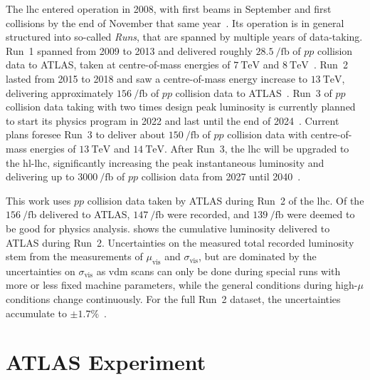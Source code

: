 The \gls{lhc} entered operation in 2008, with first beams in September and first collisions by the end of November that same year~\cite{startup}. Its operation is in general structured into so-called \textit{Runs}, that are spanned by multiple years of data-taking. Run~1 spanned from 2009 to 2013 and delivered roughly $\SI{28.5}{\per\femto\barn}$ of $pp$ collision data to ATLAS, taken at centre-of-mass energies of $\SI{7}{\TeV}$ and $\SI{8}{\TeV}$~\cite{Aad:2011dr,Aad:1517411,Aaboud:2016hhf}. Run~2 lasted from 2015 to 2018 and saw a centre-of-mass energy increase to $\SI{13}{\TeV}$, delivering approximately $\SI{156}{\per\femto\barn}$ of $pp$ collision data to ATLAS~\cite{ATLAS-CONF-2019-021}. Run~3 of $pp$ collision data taking with two times design peak luminosity is currently planned to start its physics program in 2022 and last until the end of 2024~\cite{run3}. Current plans foresee Run~3 to deliver about $\SI{150}{\per\femto\barn}$ of $pp$ collision data with centre-of-mass energies of $\SI{13}{\TeV}$ and $\SI{14}{\TeV}$. After Run~3, the \gls{lhc} will be upgraded to the \gls{hl-lhc}, significantly increasing the peak instantaneous luminosity and delivering up to $\SI{3000}{\per\femto\barn}$ of $pp$ collision data from 2027 until 2040~\cite{run3,Apollinari:2284929}. 

This work uses $pp$ collision data taken by ATLAS during Run~2 of the \gls{lhc}. Of the $\SI{156}{\per\femto\barn}$ delivered to ATLAS, $\SI{147}{\per\femto\barn}$ were recorded, and $\SI{139}{\per\femto\barn}$ were deemed to be good for physics analysis.  shows the cumulative luminosity delivered to ATLAS during Run~2. Uncertainties on the measured total recorded luminosity stem from the measurements of $\mu_\mathrm{vis}$ and $\sigma_\mathrm{vis}$, but are dominated by the uncertainties on $\sigma_\mathrm{vis}$ as \gls{vdm} scans can only be done during special runs with more or less fixed machine parameters, while the general conditions during high-$\mu$ conditions change continuously. For the full Run~2 dataset, the uncertainties accumulate to $\pm 1.7 \%$~\cite{ATLAS-CONF-2019-021}.

\section{ATLAS Experiment}\label{sec:atlas_experiment}

